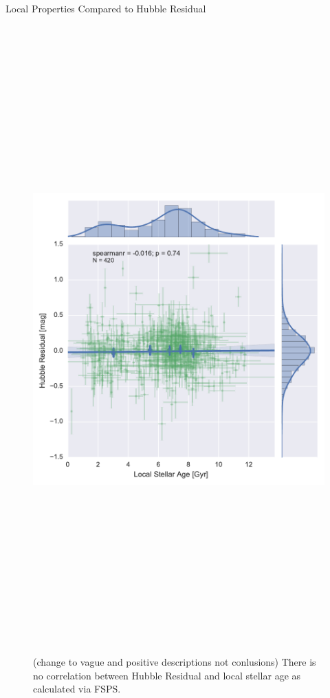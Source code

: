\documentclass[final]{beamer}
\newlength{\onecolwid}
\begin{document}
\begin{frame}[t]
\begin{columns}[t]
\begin{column}{\onecolwid}
\begin{block}{Local Properties Compared to Hubble Residual}
\begin{figure}
    \centering
    \includegraphics[height=9.5in]{HRvAge.pdf}
    \caption{(change to vague and positive descriptions not conlusions) There is no correlation between Hubble Residual \cite{Campbell13} and local stellar age as calculated via FSPS.}
    \label{fig:HRvAge}
\end{figure}


\end{block}
\end{column}
\end{columns}
\end{frame}
\end{document}
